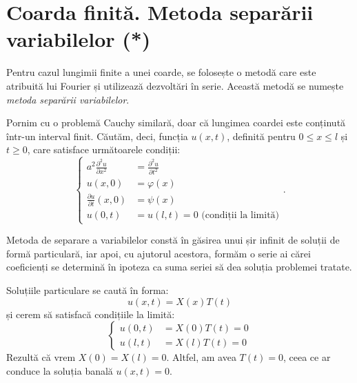 \documentclass[11pt,a4paper]{article}
\theoremstyle{dotless}
\theoremstyle{dotlessdr}
\begin{document}

\section{Coarda finită. Metoda separării variabilelor (*)}

Pentru cazul lungimii finite a unei coarde, se folosește o metodă care este
atribuită lui Fourier și utilizează dezvoltări în serie. Această metodă se
numește \emph{metoda separării variabilelor}.

Pornim cu o problemă Cauchy similară, doar că lungimea coardei este conținută
într-un interval finit. Căutăm, deci, funcția $ u(x, t) $, definită pentru
$ 0 \leq x \leq l $ și $ t \geq 0 $, care satisface următoarele condiții:
\[
  \begin{cases}
    a^2 \frac{\partial^2 u}{\partial x^2} &= \frac{\partial^2 u}{\partial t^2} \\
    u(x, 0) &= \varphi(x) \\
    \frac{\partial u}{\partial t}(x, 0) &= \psi(x) \\
    u(0, t) &= u(l, t) = 0 \text{ (condiții la limită)}
  \end{cases}.
\]

Metoda de separare a variabilelor constă în găsirea unui șir infinit de soluții
de formă particulară, iar apoi, cu ajutorul acestora, formăm o serie ai cărei
coeficienți se determină în ipoteza ca suma seriei să dea soluția problemei tratate.

Soluțiile particulare se caută în forma:
\[
  u(x, t) = X(x)T(t)
\]
și cerem să satisfacă condițiile la limită:
\[
  \begin{cases}
    u(0, t) &= X(0)T(t) = 0 \\
    u(l, t) &= X(l)T(t) = 0
  \end{cases}
\]
Rezultă că vrem $ X(0) = X(l) = 0 $. Altfel, am avea $ T(t) = 0 $, ceea ce ar conduce la
soluția banală $ u(x, t) = 0 $.
\end{document}
